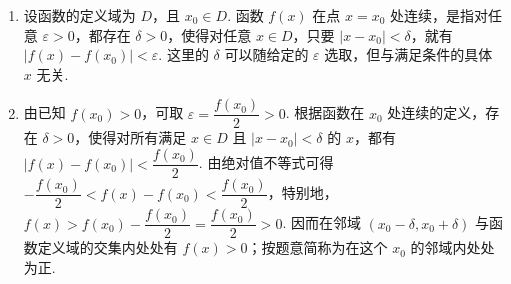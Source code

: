 \begin{solution}
\begin{enumerate}
    \item 设函数的定义域为 \(D\)，且 \(x_0\in D\). 函数 \(f(x)\) 在点 \(x=x_0\) 处连续，是指对任意 \(\varepsilon>0\)，都存在 \(\delta>0\)，使得对任意 \(x\in D\)，只要 \(\lvert x-x_0\rvert<\delta\)，就有 \(\lvert f(x)-f(x_0)\rvert<\varepsilon\). 这里的 \(\delta\) 可以随给定的 \(\varepsilon\) 选取，但与满足条件的具体 \(x\) 无关.
    \item 由已知 \(f(x_0)>0\)，可取 \(\varepsilon=\dfrac{f(x_0)}{2}>0\). 根据函数在 \(x_0\) 处连续的定义，存在 \(\delta>0\)，使得对所有满足 \(x\in D\) 且 \(\lvert x-x_0\rvert<\delta\) 的 \(x\)，都有 \(\lvert f(x)-f(x_0)\rvert<\dfrac{f(x_0)}{2}\). 由绝对值不等式可得 \(-\dfrac{f(x_0)}{2}<f(x)-f(x_0)<\dfrac{f(x_0)}{2}\)，特别地，\(f(x)>f(x_0)-\dfrac{f(x_0)}{2}=\dfrac{f(x_0)}{2}>0\). 因而在邻域 \(\left(x_0-\delta,x_0+\delta\right)\) 与函数定义域的交集内处处有 \(f(x)>0\)；按题意简称为在这个 \(x_0\) 的邻域内处处为正.
\end{enumerate}
\end{solution}

